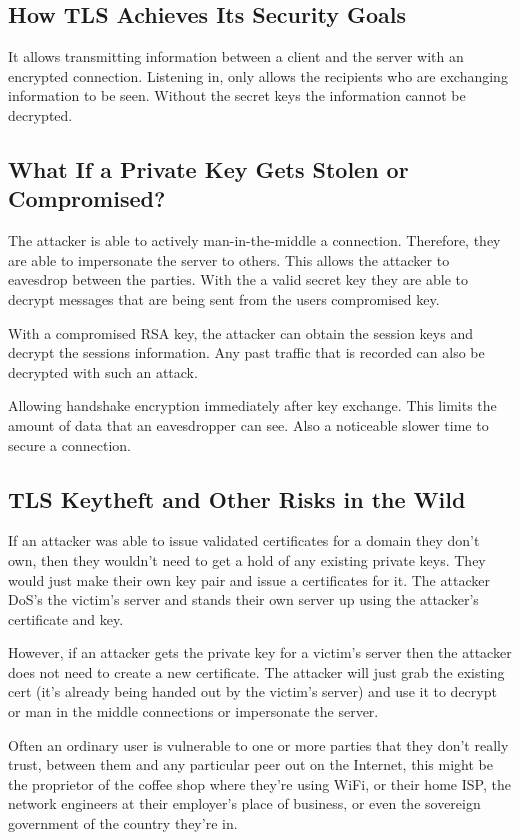 \documentclass[11pt]{article} %
\begin{document}
\subsection{How TLS Achieves Its Security Goals}
{\parindent0pt It allows transmitting information between a client and the 
server with an encrypted connection. Listening in, only allows the recipients 
who are exchanging information to be seen. Without the secret keys the 
information cannot be decrypted.}

\subsection{What If a Private Key Gets Stolen or Compromised?}
{\parindent0pt The attacker is able to actively man-in-the-middle a connection.
Therefore, they are able to impersonate the server to others. This allows the 
attacker to eavesdrop between the parties. With the a valid secret key they are
able to decrypt messages that are being sent from the users compromised key.}

\bigskip
{\parindent0pt With a compromised RSA key, the attacker can obtain the session
keys and decrypt the sessions information. Any past traffic that is recorded 
can also be decrypted with such an attack.}

\bigskip
{\parindent0pt Allowing handshake encryption immediately after key exchange. 
This limits the amount of data that an eavesdropper can see. Also a noticeable 
slower time to secure a connection.}

\subsection{TLS Keytheft and Other Risks in the Wild}
{\parindent0pt If an attacker was able to issue validated certificates for a 
domain they don’t own, then they wouldn’t need to get a hold of any existing 
private keys. They would just make their own key pair and issue a certificates 
for it. The attacker DoS’s the victim’s server and stands their own server up 
using the attacker’s certificate and key.}

\bigskip
{\parindent0pt However, if an attacker gets the private key for a victim’s 
server then the attacker does not need to create a new certificate. The attacker
will just grab the existing cert (it’s already being handed out by the victim’s
server) and use it to decrypt or man in the middle connections or impersonate the server.}

\bigskip
{\parindent0pt Often an ordinary user is vulnerable to one or more parties that 
they don't really trust, between them and any particular peer out on the 
Internet, this might be the proprietor of the coffee shop where they're using 
WiFi, or their home ISP, the network engineers at their employer's place of 
business, or even the sovereign government of the country they're in.}
\end{document}
